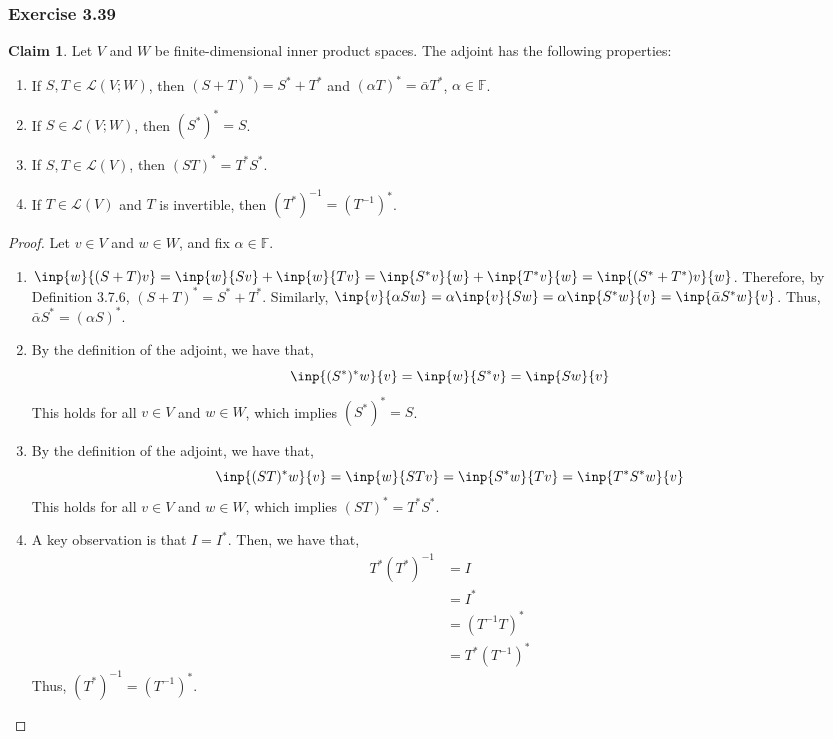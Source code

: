 \documentclass[letterpaper,12pt]{article}
\theoremstyle{definition}
\newtheorem{claim}[theorem]{Claim}
\begin{document}
\subsubsection*{Exercise 3.39}
\begin{claim}
	Let $V$ and $W$ be finite-dimensional inner product spaces. The adjoint has the following properties:
	\begin{enumerate}
		\item If $S,T \in \mathscr{L}(V;W)$, then $(S + T)^*) = S^* + T^*$ and $(\alpha T)^* = \bar{\alpha}T^*$, $\alpha \in \mathbb{F}$.
		\item If $S \in \mathscr{L}(V;W)$, then $(S^*)^* = S$.
		\item If $S,T \in \mathscr{L}(V)$, then $(ST)^* = T^*S^*$.
		\item If $T \in \mathscr{L}(V)$ and $T$ is invertible, then $(T^*)^{-1} = (T^{-1})^*$.
	\end{enumerate}
\end{claim}
\begin{proof}
	Let $v \in V$ and $w \in W$, and fix $\alpha \in \mathbb{F}$.
	\begin{enumerate}
		\item $\inp{w}{(S+T)v} = \inp{w}{Sv} +  \inp{w}{Tv} = \inp{S^*v}{w} + \inp{T^*v}{w} = \inp{(S^* + T^*)v}{w}$. Therefore, by Definition 3.7.6, $(S+T)^* = S^* + T^*$. Similarly, $\inp{v}{ \alpha S w} = \alpha\inp{v}{Sw} = \alpha\inp{S^*w}{v} = \inp{\bar{\alpha}S^*w}{v}$. Thus, $\bar{\alpha}S^* = (\alpha S)^*$.
		\item By the definition of the adjoint, we have that,
		\begin{equation}
		\inp{(S^*)^*w}{v} = \inp{w}{S^*v} = \inp{Sw}{v}
		\end{equation}
		This holds for all $v \in V$ and $w \in W$, which implies $(S^*)^* = S$.
		\item By the definition of the adjoint, we have that,
		\begin{equation}
		\inp{(ST)^*w}{v} = \inp{w}{STv} = \inp{S^*w}{Tv} = \inp{T^*S^*w}{v}
		\end{equation}
		This holds for all $v \in V$ and $w \in W$, which implies $(ST)^* = T^*S^*$.
		\item A key observation is that $I = I^*$. Then, we have that,
		\begin{align*}
		 T^* (T^*)^{-1} &= I \\
							 &= I^* \\
							 &= (T^{-1} T)^* \\
							 &= T^*(T^{-1})^* \tag{by the previous claim} 
		\end{align*}
		Thus, $(T^*)^{-1} = (T^{-1})^*$.
	\end{enumerate}
\end{proof}
\end{document}
